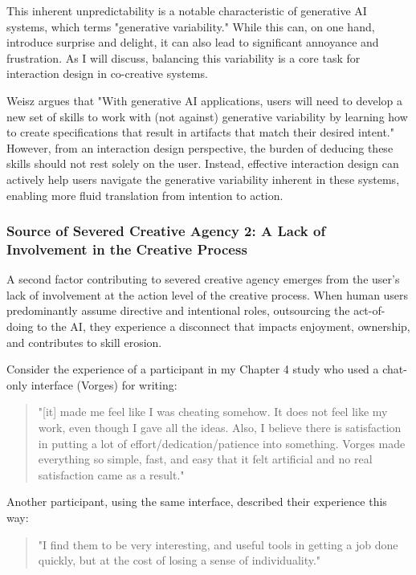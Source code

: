 This inherent unpredictability is a notable characteristic of generative AI systems, which \cite{Weisz2024-io} terms "generative variability." While this can, on one hand, introduce surprise and delight, it can also lead to significant annoyance and frustration. As I will discuss, balancing this variability is a core task for interaction design in co-creative systems.

Weisz argues that "With generative AI applications, users will need to develop a new set of skills to work with (not against) generative variability by learning how to create specifications that result in artifacts that match their desired intent." However, from an interaction design perspective, the burden of deducing these skills should not rest solely on the user. Instead, effective interaction design can actively help users navigate the generative variability inherent in these systems, enabling more fluid translation from intention to action.

\subsubsection{Source of Severed Creative Agency 2: A Lack of Involvement in the Creative Process}

A second factor contributing to severed creative agency emerges from the user's lack of involvement at the action level of the creative process. When human users predominantly assume directive and intentional roles, outsourcing the act-of-doing to the AI, they experience a disconnect that impacts enjoyment, ownership, and contributes to skill erosion. 

Consider the experience of a participant in my Chapter 4 study who used a chat-only interface (Vorges) for writing:

\begin{quote}
"[it] made me feel like I was cheating somehow. It does not feel like my work, even though I gave all the ideas. Also, I believe there is satisfaction in putting a lot of effort/dedication/patience into something. Vorges made everything so simple, fast, and easy that it felt artificial and no real satisfaction came as a result."
\end{quote}

Another participant, using the same interface, described their experience this way:

\begin{quote}
"I find them to be very interesting, and useful tools in getting a job done quickly, but at the cost of losing a sense of individuality."
\end{quote}

